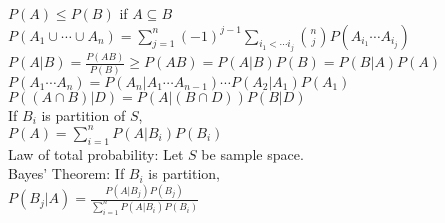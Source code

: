 \documentclass{article}
\begin{document}
\begin{figure}[h!]
\begin{subfigure}[h!]{0.49\textwidth}
        $P(A)\leq P(B)$ if $A\subseteq B$\\
        $P(A_{1}\cup\cdots\cup A_{n})=\sum_{j=1}^{n}(-1)^{j-1}\sum_{i_{1}<\cdots i_{j}}\binom{n}{j}P(A_{i_{1}}\cdots A_{i_{j}})$\\
        $P(A\vert B)=\frac{P(AB)}{P(B)}\geq P(AB)=P(A\vert B)P(B)=P(B\vert A)P(A)$\\
        $P(A_{1}\cdots A_{n})=P(A_{n}\vert A_{1}\cdots A_{n-1})\cdots P(A_{2}\vert A_{1})P(A_{1})$\\
        $P((A\cap B)\vert D)=P(A\vert(B\cap D))P(B\vert D)$\\
        If $B_{i}$ is partition of $S$, $P(A)=\sum_{i=1}^{n}P(A\vert B_{i})P(B_{i})$\\
        Law of total probability: Let $S$ be sample space.\\
        Bayes' Theorem: If $B_{i}$ is partition, $P(B_{j}\vert A)=\frac{P(A\vert B_{j})P(B_{j})}{\sum_{i=1}^{n}P(A\vert B_{i})P(B_{i})}$
    \end{subfigure}
\end{figure}
\end{document}
